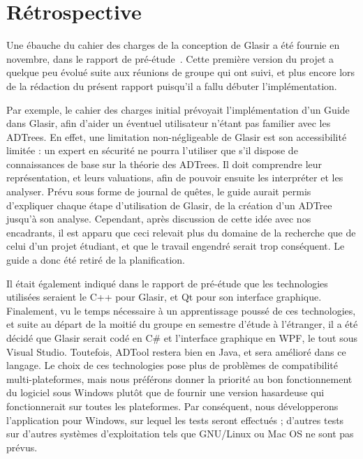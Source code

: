 \section{Rétrospective}
    \label{sec:retro}

    Une ébauche du cahier des charges de la conception de Glasir a été fournie en novembre, dans le rapport de pré-étude~\cite{pre_etude}. Cette première version du projet a quelque peu évolué suite aux réunions de groupe qui ont suivi, et plus encore lors de la rédaction du présent rapport puisqu'il a fallu débuter l'implémentation.

    Par exemple, le cahier des charges initial prévoyait l'implémentation d'un \og Guide \fg{} dans Glasir, afin d'aider un éventuel utilisateur n'étant pas familier avec les ADTrees. En effet, une limitation non-négligeable de Glasir est son accessibilité limitée : un expert en sécurité ne pourra l'utiliser que s'il dispose de connaissances de base sur la théorie des ADTrees. Il doit comprendre leur représentation, et leurs valuations, afin de pouvoir ensuite les interpréter et les analyser. Prévu sous forme de journal de quêtes, le guide aurait permis d'expliquer chaque étape d'utilisation de Glasir, de la création d'un ADTree jusqu'à son analyse. Cependant, après discussion de cette idée avec nos encadrants, il est apparu que ceci relevait plus du domaine de la recherche que de celui d'un projet étudiant, et que le travail engendré serait trop conséquent. Le guide a donc été retiré de la planification.

    Il était également indiqué dans le rapport de pré-étude que les technologies utilisées seraient le C++ pour Glasir, et Qt pour son interface graphique. Finalement, vu le temps nécessaire à un apprentissage poussé de ces technologies, et suite au départ de la moitié du groupe en semestre d'étude à l'étranger, il a été décidé que Glasir serait codé en C\# et l'interface graphique en WPF, le tout sous Visual Studio. Toutefois, ADTool restera bien en Java, et sera amélioré dans ce langage. Le choix de ces technologies pose plus de problèmes de compatibilité multi-plateformes, mais nous préférons donner la priorité au bon fonctionnement du logiciel sous Windows plutôt que de fournir une version hasardeuse qui fonctionnerait sur toutes les plateformes. Par conséquent, nous développerons l'application pour Windows, sur lequel les tests seront effectués ; d'autres tests sur d'autres systèmes d'exploitation tels que GNU/Linux ou Mac OS ne sont pas prévus.
